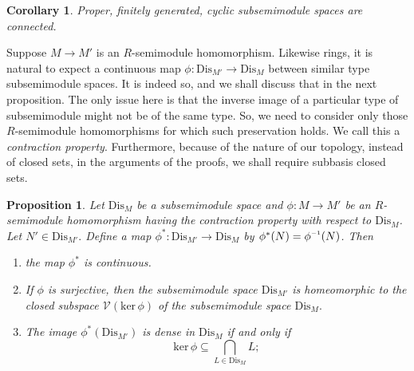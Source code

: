 \documentclass[12pt,english]{smfart}
\newcommand{\inv}{^{\raisebox{.2ex}{$\scriptscriptstyle-1$}}}
\newtheorem{proposition}[theorem]{Proposition}
\newtheorem{corollary}[theorem]{Corollary}
\theoremstyle{definition}
\begin{document}
\begin{corollary}
Proper, finitely generated, cyclic subsemimodule spaces are connected. 
\end{corollary} 

Suppose $M\to M'$ is an $R$-semimodule homomorphism. Likewise rings, it is natural to expect a continuous map  $\phi\colon \mathrm{Dis}_{M'}\to \mathrm{Dis}_M$ between similar type subsemimodule spaces. It is indeed so, and we shall discuss that in the next proposition. The only issue here is that the inverse image of a particular type of subsemimodule might not be of the same type. So, we need to consider only those $R$-semimodule homomorphisms for which such preservation holds. We call this a \emph{contraction property}. Furthermore, because of the nature of our topology, instead of closed sets, in the arguments of the proofs, we shall require subbasis closed sets. 

\begin{proposition}\label{conmap}
Let $\mathrm{Dis}_M$ be a subsemimodule space and $\phi\colon M\to M'$ be an $R$-semimodule homomorphism having the contraction property with respect to $\mathrm{Dis}_M$.   Let $N'\in\mathrm{Dis}_{M'}.$ Define a map $\phi^*\colon  \mathrm{Dis}_{M'}\to \mathrm{Dis}_{M}$ by  $\phi^*(N)=\phi\inv(N)$. Then
\begin{enumerate}[\upshape (1)]
		
\item \label{contxr} the map $\phi^*$ is    continuous.
		
\item \label{shcs} If $\phi$ is  surjective, then the subsemimodule space $\mathrm{Dis}_{M'}$ is homeomorphic to the closed subspace $\mathcal{V}(\mathrm{ker}\,\phi)$ of the subsemimodule space $\mathrm{Dis}_{M}.$
		
\item \label{imde} The image  $\phi^*(\mathrm{Dis}_{M'})$ is dense in $\mathrm{Dis}_{M}$ if and only if $$\mathrm{ker}\,\phi\subseteq \bigcap_{L\in \mathrm{Dis}_{M}}L;$$
\end{enumerate}
\end{proposition}
\end{document}
